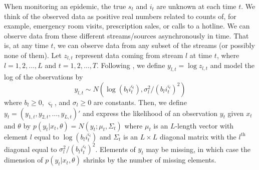 \documentclass[useAMS,referee,usenatbib]{biom}
\begin{document}

When monitoring an epidemic, the true $s_t$ and $i_t$ are unknown at each time $t$. We think of the observed data as positive real numbers related to counts of, for example, emergency room visits, prescription sales, or calls to a hotline.  %
We can observe data from these different streams/sources asynchronously in time.  That is, at any time $t$, we can observe data from any subset of the streams (or possibly none of them).  Let $z_{l,t}$ represent data coming from stream $l$ at time $t$, where $l = 1,2,\ldots,L$ and $t = 1,2,\ldots,T$.  %
Following \citet{skvortsov2012monitoring}, we define $y_{l,t} = \log z_{l,t}$ and model the log of the observations by
\begin{equation}
y_{l,t} \sim N\left(\log\left(b_li_t^{\varsigma_l}\right),\sigma_l^2 / (b_li_t^{\varsigma_l})^2\right) \label{eqn:obs}
\end{equation}
where $b_l \ge 0$, $\varsigma_l$, and $\sigma_l \ge 0$ are constants.  Then, we define $y_t = (y_{1,t},y_{2,t},\ldots,y_{L,t})'$ and express the likelihood of an observation $y_t$ given $x_t$ and $\theta$ by $p(y_t|x_t,\theta) = N(y_t;\mu_t,\Sigma_t)$ where $\mu_t$ is an $L$-length vector with element $l$ equal to $\log(b_li_t^{\varsigma_l})$ and $\Sigma_t$ is an $L \times L$ diagonal matrix with the $l^{\mbox{th}}$ diagonal equal to $\sigma_l^2 / (b_li_t^{\varsigma_l})^2$.  Elements of $y_t$ may be missing, in which case the dimension of $p(y_t|x_t,\theta)$ shrinks by the number of missing elements. %
\end{document}
